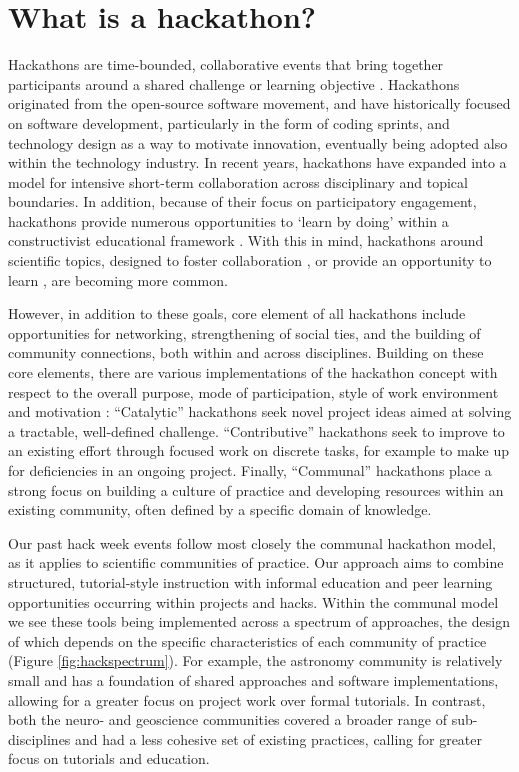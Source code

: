 \section*{What is a hackathon?}

Hackathons are time-bounded, collaborative events that bring together participants around a shared challenge or learning objective \cite{Decker2015}.
Hackathons originated from the open-source software movement, and have historically focused on software development, particularly in the form of coding sprints, and technology design as a way to motivate innovation, eventually being adopted also within the technology industry.
In recent years, hackathons have expanded into a model for intensive short-term collaboration across disciplinary and topical boundaries.
In addition, because of their focus on participatory engagement, hackathons provide numerous opportunities to `learn by doing' within a constructivist educational framework \cite{Bransford2000-lu,Papert1980-fh}.
With this in mind, hackathons around scientific topics, designed to foster collaboration \cite{Groen2015-cj,Moller2013-ah}, or provide an opportunity to learn \cite{Kienzler2015-zu,Lamers2014-xf}, are becoming more common.

However, in addition to these goals, core element of all hackathons include opportunities for networking, strengthening of social ties, and the building of community connections, both within and across disciplines.
Building on these core elements, there are various implementations of the hackathon concept with respect to the overall purpose, mode of participation, style of work environment and motivation \cite{Drouhard2017}:
``Catalytic'' hackathons seek novel project ideas aimed at solving a tractable, well-defined challenge.
``Contributive'' hackathons seek to improve to an existing effort through focused work on discrete tasks, for example to make up for deficiencies in an ongoing project.
Finally, ``Communal'' hackathons place a strong focus on building a culture of practice and developing resources within an existing community, often defined by a specific domain of knowledge.

Our past hack week events follow most closely the communal hackathon model, as it applies to scientific communities of practice.
Our approach aims to combine structured, tutorial-style instruction with informal education and peer learning opportunities occurring within projects and hacks.
Within the communal model we see these tools being implemented across a spectrum of approaches, the design of which depends on the specific characteristics of each community of practice (Figure \ref{fig:hackspectrum}).
For example, the astronomy community is relatively small and has a foundation of shared approaches and software implementations, allowing for a greater focus on project work over formal tutorials.
In contrast, both the neuro- and geoscience communities covered a broader range of sub-disciplines and had a less cohesive set of existing practices, calling for greater focus on tutorials and education.

